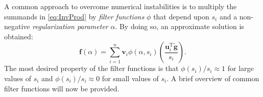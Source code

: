 \documentclass[12pt]{article}
\newcommand{\gnoise}{\widetilde{\mathbf{g}}}
\newcommand{\fdis}{\mathbf{f}}
\newcommand{\trans}{\mathrm{T}}	%
\newcommand{\regparam}{\alpha}
\newcommand{\filt}{\phi}
\newcommand{\singular}{s}	%
\newcommand{\LSV}{\mathbf{u}}	%
\newcommand{\RSV}{\mathbf{v}}	%
\begin{document}
A common approach to overcome numerical instabilities is to multiply the summands in \eqref{eq:InvProd} by \textit{filter functions} $\filt$ that depend upon $\singular_i$ and a non-negative \textit{regularization parameter} $\regparam$. By doing so, an approximate solution is obtained:
\begin{equation}
\fdis(\regparam) = \sum_{i = 1}^n \RSV_i\filt(\regparam,\singular_i)\left(\frac{{\LSV^\trans_i}\gnoise}{\singular_i}\right).
\label{eq:ApproxSol}
\end{equation}
The most desired property of the filter functions is that $\filt(\singular_i)/\singular_i \approx 1$  for large values of $\singular_i$ and $\filt(\singular_i)/\singular_i \approx 0$ for small values of $\singular_i$. A brief overview of common filter functions will now be provided. 
\end{document}
